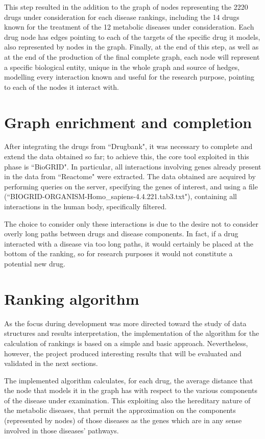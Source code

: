 This step resulted in the addition to the graph of nodes representing the 2220 drugs under consideration for each disease rankings, including the 14 drugs known for the treatment of the 12 metabolic diseases under consideration.
Each drug node has edges pointing to each of the targets of the specific drug it models, also represented by nodes in the graph. Finally, at the end of this step, as well as at the end of the production of the final complete graph, each node will represent a specific biological entity, unique in the whole graph and source of hedges, modelling every interaction known and useful for the research purpose, pointing to each of the nodes it interact with.

\section{Graph enrichment and completion}
After integrating the drugs from ``Drugbank"\cite{drugbank}, it was necessary to complete and extend the data obtained so far; to achieve this, the core tool exploited in this phase is ``BioGRID"\cite{biogrid}. In particular, all interactions involving genes already present in the data from ``Reactome" were extracted. The data obtained are acquired by performing queries on the server, specifying the genes of interest, and using a  file (``BIOGRID-ORGANISM-Homo\_sapiens-4.4.221.tab3.txt"), containing all interactions in the human body, specifically filtered. 

The choice to consider only these interactions is due to the desire not to consider overly long paths between drugs and disease components. In fact, if a drug interacted with a disease via too long paths, it would certainly be placed at the bottom of the ranking, so for research purposes it would not constitute a potential new drug.

\section{Ranking algorithm}

As the focus during development was more directed toward the study of data structures and results interpretation, the implementation of the algorithm for the calculation of rankings is based on a simple and basic approach. Nevertheless, however, the project produced interesting results that will be evaluated and validated in the next sections. 

The implemented algorithm calculates, for each drug, the average distance that the node that models it in the graph has with respect to the various components of the disease under examination. This exploiting also the hereditary nature of the metabolic diseases, that permit the approximation on the components (represented by nodes) of those diseases as the genes which are in any sense involved in those diseases' pathways.

